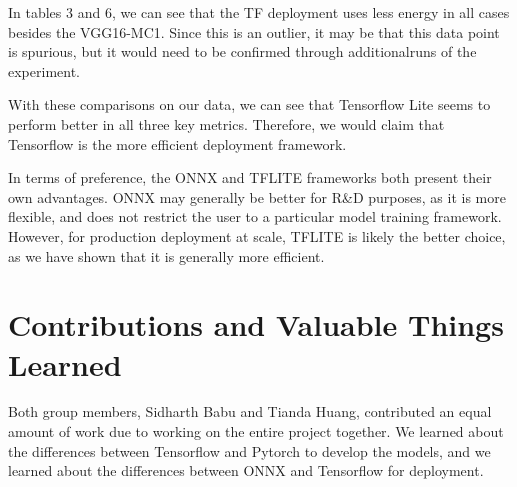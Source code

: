\documentclass{article}
\begin{document}
In tables 3 and 6, we can see that the TF deployment uses less energy in all cases besides the VGG16-MC1. Since this is an outlier, it may be that this data point is spurious, but it would need to be confirmed through additionalruns of the experiment.

With these comparisons on our data, we can see that Tensorflow Lite seems to perform better in all three key metrics. Therefore, we would claim that Tensorflow is the more efficient deployment framework. 

In terms of preference, the ONNX and TFLITE frameworks both present their own advantages. ONNX may generally be better for R\&D purposes, as it is more flexible, and does not restrict the user to a particular model training framework. However, for production deployment at scale, TFLITE is likely the better choice, as we have shown that it is generally more efficient.


\section*{Contributions and Valuable Things Learned}
Both group members, Sidharth Babu and Tianda Huang, contributed an equal amount of work due to working on the entire project together.
We learned about the differences between Tensorflow and Pytorch to develop the models, and we learned about the differences between ONNX and Tensorflow for deployment.
\end{document}
